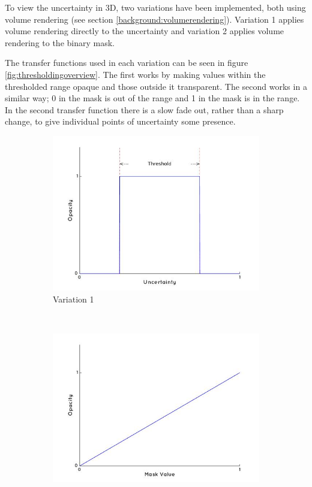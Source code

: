 To view the uncertainty in 3D, two variations have been implemented, both using volume rendering (see section \ref{background:volumerendering}). Variation 1 applies volume rendering directly to the uncertainty and variation 2 applies volume rendering to the binary mask.

The transfer functions used in each variation can be seen in figure \ref{fig:thresholdingoverview}. The first works by making values within the thresholded range opaque and those outside it transparent. The second works in a similar way; 0 in the mask is out of the range and 1 in the mask is in the range. In the second transfer function there is a slow fade out, rather than a sharp change, to give individual points of uncertainty some presence.

\begin{figure}[H]
  \centering
  \begin{subfigure}[b]{0.5\textwidth}
    \includegraphics[width=\textwidth]{images/thresholding/thresholdvariation1.jpg}
    \caption{Variation 1}
    \label{fig:thresholdingvariation1}
  \end{subfigure}%
  ~ %
  \begin{subfigure}[b]{0.5\textwidth}
    \includegraphics[width=\textwidth]{images/thresholding/thresholdvariation2.jpg}

\end{subfigure}
\end{figure}
